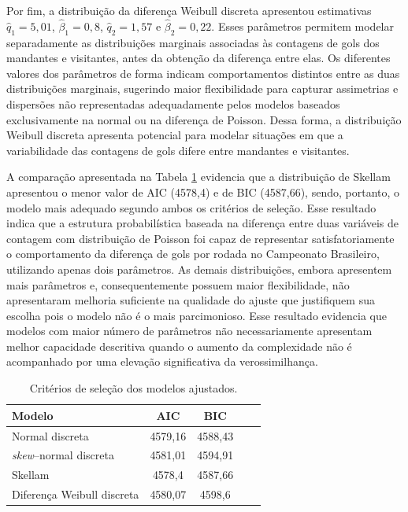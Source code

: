 \documentclass[12pt,a4paper]{article}\usepackage[]{graphicx}\usepackage[]{xcolor}
\begin{document}
Por fim, a distribuição da diferença Weibull discreta apresentou estimativas 
$\hat{q}_1=5,01$, $\hat{\beta}_1=0,8$, $\hat{q}_2=1,57$ e $\hat{\beta}_2=0,22$. Esses parâmetros permitem modelar separadamente as distribuições marginais associadas às contagens de gols dos mandantes e visitantes, antes da obtenção da diferença entre elas. Os diferentes valores dos parâmetros de forma indicam comportamentos distintos entre as duas distribuições marginais, sugerindo maior flexibilidade para capturar assimetrias e dispersões não representadas adequadamente pelos modelos baseados exclusivamente na normal ou na diferença de Poisson. Dessa forma, a distribuição Weibull discreta apresenta potencial para modelar situações em que a variabilidade das contagens de gols difere entre mandantes e visitantes.

A comparação apresentada na Tabela \ref{tab:criterios} evidencia que a distribuição de Skellam apresentou o menor valor de AIC (4578,4) e de BIC (4587,66), sendo, portanto, o modelo mais adequado segundo ambos os critérios de seleção. Esse resultado indica que a estrutura probabilística baseada na diferença entre duas variáveis de contagem com distribuição de Poisson foi capaz de representar satisfatoriamente o comportamento da diferença de gols por rodada no Campeonato Brasileiro, utilizando apenas dois parâmetros. As demais distribuições, embora apresentem mais parâmetros e, consequentemente possuem maior flexibilidade, não apresentaram melhoria suficiente na qualidade do ajuste que justifiquem sua escolha pois o modelo não é o mais parcimonioso. Esse resultado evidencia que modelos com maior número de parâmetros não necessariamente apresentam melhor capacidade descritiva quando o aumento da complexidade não é acompanhado por uma elevação significativa da verossimilhança.

\begin{table}[!ht]
\centering
\caption{Critérios de seleção dos modelos ajustados.}
\label{tab:criterios}
\begin{tabular}{lcccc}
\hline
Modelo &  AIC & BIC\\
\hline
Normal discreta & 4579,16 & 4588,43 \\
\textit{skew}--normal discreta & 4581,01 & 4594,91 \\
Skellam & 4578,4 & 4587,66 \\
Diferença Weibull discreta & 4580,07 & 4598,6\\
\hline
\end{tabular}
\end{table}
\end{document}
